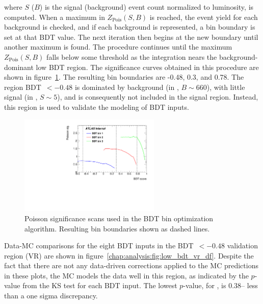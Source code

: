 \noindent
where $S$ ($B$) is the signal (background) event count normalized to
luminosity, is computed. When a maximum in $Z_{\textrm{Pois}}(S,B)$ is
reached, the event yield for each background is checked, and if each
background is represented, a bin boundary is set at that BDT
value. The next iteration then begins at the new boundary until another
maximum is found. The procedure continues until the maximum
$Z_{\textrm{Pois}}(S,B)$ falls below some threshold as the integration
nears the background-dominant low BDT region. The significance curves
obtained in this procedure are shown in
figure~\ref{chap:analysis:fig:bin_opt}. The resulting bin boundaries
are -0.48, 0.3, and 0.78. The region BDT~$<-0.48$ is dominated by
background (in \emme, $B \sim 660$), with little signal (in \emme, $S \sim 5$),
and is consequently not included in the signal region. Instead, this
region is used to validate the modeling of BDT inputs. 

\begin{figure}[h]
  \centering
  \includegraphics[width=0.6\textwidth]{fig/analysis/bin_opt_plot.pdf}
  \caption{Poisson significance scans used in the BDT bin optimization
  algorithm. Resulting bin boundaries shown as dashed lines.}
  \label{chap:analysis:fig:bin_opt}
\end{figure}

Data-MC comparisons for the eight BDT inputs in the BDT~$<-0.48$
validation region (VR) are shown in
figure~\ref{chap:analysis:fig:low_bdt_vr_df}. Despite the fact that
there are not any data-driven corrections applied to the MC
predictions in these plots, the MC models the data well in this
region, as indicated by the $p$-value from the KS test for each BDT
input. The lowest $p$-value, for \lepEtaCent, is 0.38-- less than a
one sigma discrepancy. 

